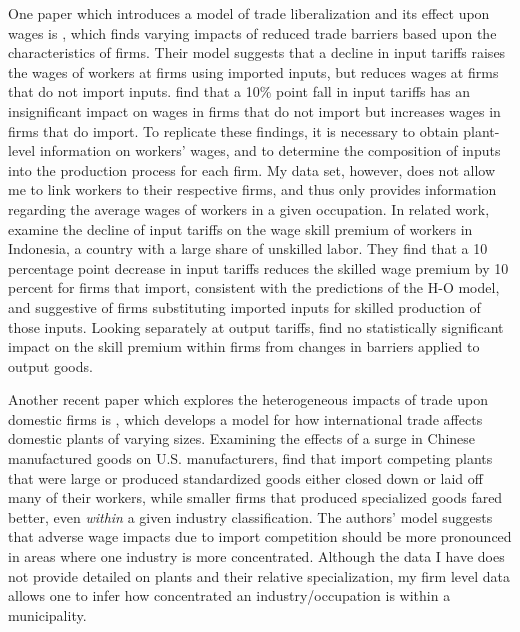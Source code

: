 \documentclass[12pt]{article}
\begin{document}
One paper which introduces a model of trade liberalization and its effect upon wages is \citet{amiti},
which finds varying impacts of reduced trade barriers based upon the characteristics of
firms. Their model suggests that a decline in input tariffs raises the wages of workers at firms
using imported inputs, but reduces wages at firms that do not import inputs. 
\citeauthor{amiti} find that a 10\% point fall in input tariffs has an insignificant impact
on wages in firms that do not import but increases wages in firms that do import. 
To replicate these findings, it is necessary to obtain plant-level information on workers'
wages, and to determine the composition of inputs into the production process for each firm.
My data set, however, does not allow me to link workers to their respective firms, and thus only
provides information regarding the average wages of workers in a given occupation. 
In related work, \citet{amiti2012trade} examine the decline of input tariffs on the wage skill
premium of workers in Indonesia, a country with a large share of unskilled labor.
They find that a 10 percentage point decrease in input tariffs reduces the skilled wage premium
by 10 percent for firms that import, consistent with the predictions of the H-O model, and suggestive
of firms substituting imported inputs for skilled production of those inputs. Looking separately at
output tariffs, \citeauthor{amiti2012trade} find no statistically significant impact on the 
skill premium within firms from changes in barriers applied to output goods.

Another recent paper which explores the heterogeneous impacts of trade upon domestic firms is 
\citet{holmes1}, which develops a model for how international trade affects domestic plants of varying sizes. 
Examining the effects of a surge in Chinese manufactured goods on U.S. manufacturers,
\citeauthor{holmes1} find that import competing plants that were large or produced standardized goods 
either closed down or laid off many of their workers, while smaller firms that produced specialized 
goods fared better, even \textit{within} a given industry classification. The authors' 
model suggests that adverse wage impacts due to import competition should be more pronounced in 
areas where one industry is more concentrated. Although the data I have does not provide detailed
on plants and their relative specialization, my firm level data allows one to infer how concentrated an
industry/occupation is within a municipality.
\end{document}
